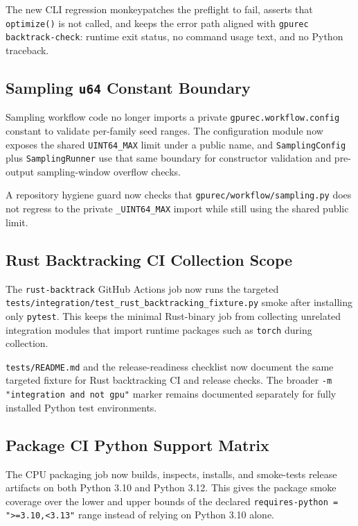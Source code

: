 \documentclass[11pt]{article}
\begin{document}
The new CLI regression monkeypatches the preflight to fail, asserts that
\texttt{optimize()} is not called, and keeps the error path aligned with
\texttt{gpurec backtrack-check}: runtime exit status, no command usage text,
and no Python traceback.

\subsection{Sampling \texttt{u64} Constant Boundary}

Sampling workflow code no longer imports a private
\texttt{gpurec.workflow.config} constant to validate per-family seed ranges.
The configuration module now exposes the shared \texttt{UINT64\_MAX} limit
under a public name, and \texttt{SamplingConfig} plus
\texttt{SamplingRunner} use that same boundary for constructor validation and
pre-output sampling-window overflow checks.

A repository hygiene guard now checks that
\texttt{gpurec/workflow/sampling.py} does not regress to the private
\texttt{\_UINT64\_MAX} import while still using the shared public limit.

\subsection{Rust Backtracking CI Collection Scope}

The \texttt{rust-backtrack} GitHub Actions job now runs the targeted
\texttt{tests/integration/test\_rust\_backtracking\_fixture.py} smoke after
installing only \texttt{pytest}.  This keeps the minimal Rust-binary job from
collecting unrelated integration modules that import runtime packages such as
\texttt{torch} during collection.

\texttt{tests/README.md} and the release-readiness checklist now document the
same targeted fixture for Rust backtracking CI and release checks.  The broader
\texttt{-m "integration and not gpu"} marker remains documented separately for
fully installed Python test environments.

\subsection{Package CI Python Support Matrix}

The CPU packaging job now builds, inspects, installs, and smoke-tests release
artifacts on both Python 3.10 and Python 3.12.  This gives the package smoke
coverage over the lower and upper bounds of the declared
\texttt{requires-python = ">=3.10,<3.13"} range instead of relying on Python
3.10 alone.
\end{document}
